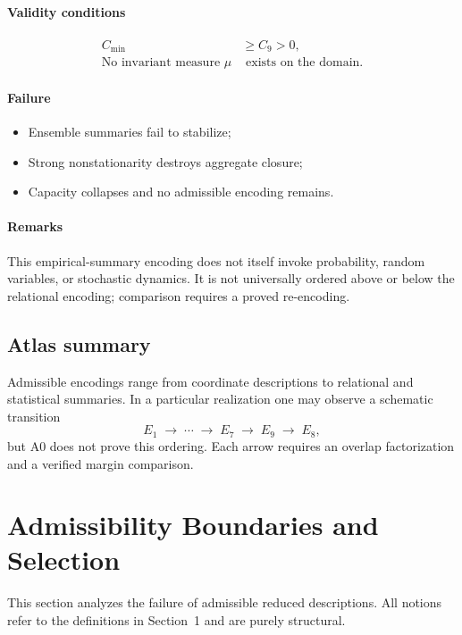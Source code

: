 \documentclass[11pt]{article}
\theoremstyle{plain}
\theoremstyle{plain}
\begin{document}
\paragraph{Validity conditions}
\begin{align}
C_{\min} &\ge C_9 > 0, \\
\text{No invariant measure } \mu &\text{ exists on the domain.}
\end{align}

\paragraph{Failure}
\begin{itemize}
\item Ensemble summaries fail to stabilize;
\item Strong nonstationarity destroys aggregate closure;
\item Capacity collapses and no admissible encoding remains.
\end{itemize}

\paragraph{Remarks}
This empirical-summary encoding does not itself invoke probability, random
variables, or stochastic dynamics.  It is not universally ordered above or
below the relational encoding; comparison requires a proved re-encoding.


\subsection{Atlas summary}

Admissible encodings range from coordinate descriptions to relational and
statistical summaries.  In a particular realization one may observe a
schematic transition
\[
E_1 \;\to\; \cdots \;\to\; E_7 \;\to\; E_9 \;\to\; E_8,
\]
but A0 does not prove this ordering.  Each arrow requires an overlap
factorization and a verified margin comparison.


\section{Admissibility Boundaries and Selection}

This section analyzes the failure of admissible reduced descriptions.
All notions refer to the definitions in Section~1 and are purely structural.
\end{document}
